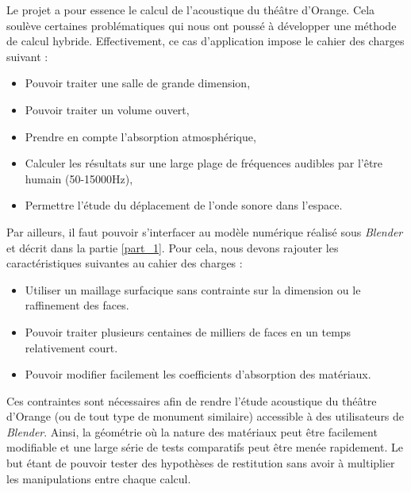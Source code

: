 \label{sect_methodecouplee}
Le projet a pour essence le calcul de l'acoustique du théâtre d'Orange. Cela soulève certaines problématiques qui nous ont poussé à développer une méthode de calcul hybride. Effectivement, ce cas d'application impose le cahier des charges suivant :
\begin{itemize}
	\item Pouvoir traiter une salle de grande dimension,
	\item Pouvoir traiter un volume ouvert,
	\item Prendre en compte l'absorption atmosphérique,
	\item Calculer les résultats sur une large plage de fréquences audibles par l'être humain (50-15000Hz),
	\item Permettre l'étude du déplacement de l'onde sonore dans l'espace.
\end{itemize}
Par ailleurs, il faut pouvoir s'interfacer au modèle numérique réalisé sous \textit{Blender} et décrit dans la partie \ref{part_1}. Pour cela, nous devons rajouter les caractéristiques suivantes au cahier des charges :

\begin{itemize}
	\item Utiliser un maillage surfacique sans contrainte sur la dimension ou le raffinement des faces.
	\item Pouvoir traiter plusieurs centaines de milliers de faces en un temps relativement court.
	\item Pouvoir modifier facilement les coefficients d'absorption des matériaux.
\end{itemize}

Ces contraintes sont nécessaires afin de rendre l'étude acoustique du théâtre d'Orange (ou de tout type de monument similaire) accessible à des utilisateurs de \textit{Blender}. Ainsi, la géométrie où la nature des matériaux peut être facilement modifiable et une large série de tests comparatifs peut être menée rapidement. Le but étant de pouvoir tester des hypothèses de restitution sans avoir à multiplier les manipulations entre chaque calcul.


